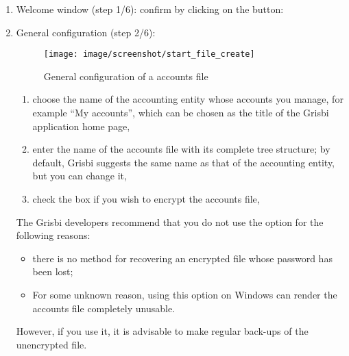 \begin{enumerate}
	\item Welcome window (step 1/6): confirm by clicking on the  button:%
	\item General configuration (step 2/6):

\begin{figure}[htbp]
	\begin{center}
		\texttt{[image: image/screenshot/start\_file\_create]}
	\end{center}
	\caption{General configuration of a accounts file}
	\label{start_file_create}
\end{figure}



		\begin{enumerate}
			\item choose the name of the accounting entity whose accounts you manage, for example \enquote{My accounts}, which can be chosen as the title of the Grisbi application home page,%
			\item enter the name of the accounts file with its complete tree structure; by default, Grisbi suggests the same name as that of the accounting entity, but you can change it,%
			\item check the  box if you wish \gls{to encrypt} the accounts file,%
		\end{enumerate}

The Grisbi developers recommend that you do not use the  option for the following reasons:
\begin{itemize}
	\item there is no method for recovering an encrypted file whose password has been lost;
	\item For some unknown reason, using this option on \gls{Windows} can render the accounts file completely unusable.
\end{itemize} 
However, if you use it, it is advisable to make regular back-ups of the unencrypted file.


\end{enumerate}
